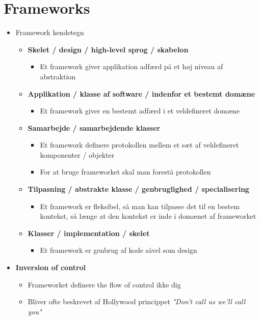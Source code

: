 \documentclass[a4, english]{article}
\begin{document}
\section{Frameworks}
\begin{itemize}
	\item Framework kendetegn
  \begin{itemize}
    \item \textbf{Skelet / design / high-level sprog / skabelon}
    \begin{itemize}
      \item Et framework giver applikation adfærd på et høj niveau af abstraktion 
    \end{itemize}
    \item \textbf{Applikation / klasse af software / indenfor et bestemt domæne} 
    \begin{itemize}
      \item Et framework giver en bestemt adfærd i et veldefineret domæne 
    \end{itemize}
    \item \textbf{Samarbejde / samarbejdende klasser}
    \begin{itemize}
      \item Et framework definere protokollen mellem et sæt af veldefineret komponenter / objekter
      \item For at bruge frameworket skal man forestå protokollen
    \end{itemize}
    \item \textbf{Tilpasning / abstrakte klasse / genbruglighed / specialisering} 
    \begin{itemize}
    	\item Et framework er fleksibel, så man kan tilpasse det til en bestem kontekst, så længe at den kontekst er inde i domænet af frameworket 
    \end{itemize}
    \item \textbf{Klasser / implementation / skelet }
    \begin{itemize}
    	\item Et framework er genbrug af kode såvel som design
    \end{itemize}
  \end{itemize}
  \item \textbf{Inversion of control}
  \begin{itemize}
  	\item Frameworket definere the flow of control ikke dig
    \item Bliver ofte beskrevet af Hollywood princippet \textit{"Don't call us we'll call you"}

\end{itemize}
\end{itemize}
\end{document}
